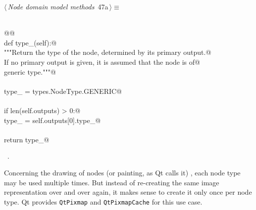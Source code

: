 \documentclass[
    a4paper,      %
    10pt,         %
    openright,    %
    notitlepage,  %
    parskip=half, %
]{scrreprt}       %
\theoremstyle{definition}                    %
\begin{document}
\begin{flushleft} \small
\begin{minipage}{\linewidth}\label{scrap63}\raggedright\small
{} $\langle\,${\itshape Node domain model methods}\nobreak\ {\footnotesize {47a}}$\,\rangle\equiv$
\vspace{-1exm}
\begin{list}{}{} \item
\mbox{}\lstinline@@\\
\mbox{}\lstinline@    @{\normalfont \fontfamily @}\lstinline@property@\\
\mbox{}\lstinline@    def type_(self):@\\
\mbox{}\lstinline@        """Return the type of the node, determined by its primary output.@\\
\mbox{}\lstinline@        If no primary output is given, it is assumed that the node is of@\\
\mbox{}\lstinline@        generic type."""@\\
\mbox{}\lstinline@@\\
\mbox{}\lstinline@        type_ = types.NodeType.GENERIC@\\
\mbox{}\lstinline@@\\
\mbox{}\lstinline@        if len(self.outputs) > 0:@\\
\mbox{}\lstinline@            type_ = self.outputs[0].type_@\\
\mbox{}\lstinline@@\\
\mbox{}\lstinline@        return type_@\\
\mbox{}\lstinline@@{\NWsep}
\end{list}
\vspace{-1.5ex}
\footnotesize
\begin{list}{}{\setlength{\itemsep}{-\parsep}\setlength{\itemindent}{-\leftmargin}}
\item \NWtxtMacroRefIn\ .

\item{}
\end{list}
\end{minipage}\vspace{4ex}
\end{flushleft}
Concerning the drawing of nodes (or painting, as Qt calls it) , each node type
may be used multiple times. But instead of re-creating the same image
representation over and over again, it makes sense to create it only once per
node type. Qt provides \verb+QtPixmap+ and \verb+QtPixmapCache+ for this use case.
\end{document}
